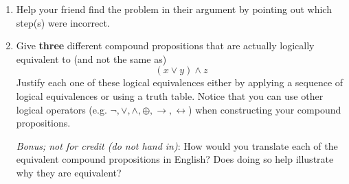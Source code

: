 \begin{enumerate}[labelindent=0pt, leftmargin=0pt]
\begin{enumerate}
        \item\gradeComplete 
        Help your friend find the problem in their argument by pointing out which step(s) were incorrect.
        
        \item\gradeComplete Give {\bf three} different compound propositions
        that are actually logically equivalent to (and not the same as)
        \[
            (x \lor y) \land z
        \]
        Justify each one of these logical equivalences either by applying a sequence of logical equivalences
        or using a truth table.  Notice that you can use other logical operators (e.g. $\lnot, \lor, \land, \oplus, \to, 
        \leftrightarrow$) 
        when constructing your compound propositions.
     
        {\it Bonus; not for credit (do not hand in)}: How would you translate each of the equivalent compound
        propositions in English? Does doing so help illustrate why they are equivalent?
        \end{enumerate}
        
     
\end{enumerate}


